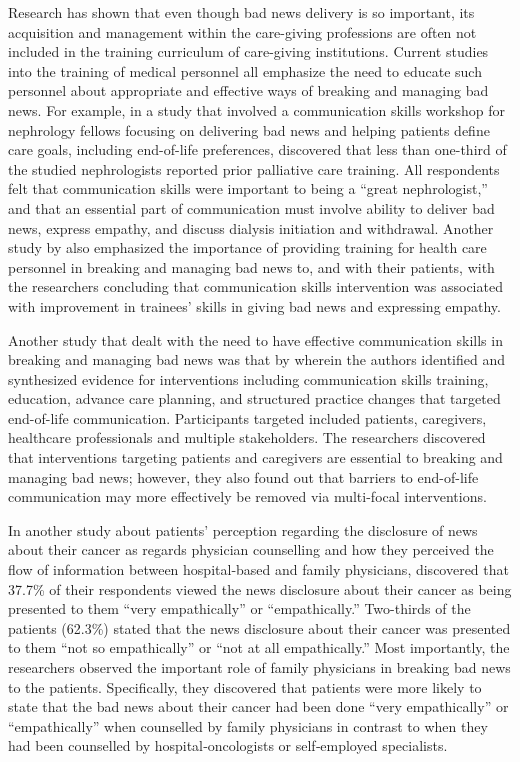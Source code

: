 \documentclass[output=paper,colorlinks,citecolor=brown]{langscibook}
\begin{document}
Research has shown that even though bad news delivery is so important, its acquisition and management within the care-giving professions are often not included in the training curriculum of care-giving institutions. Current studies into the training of medical personnel all emphasize the need to educate such personnel about appropriate and effective ways of breaking and managing bad news. For example, in a study that involved a communication skills workshop for nephrology fellows focusing on delivering bad news and helping patients define care goals, including end-of-life preferences, \citet{SchellEtAl2013} discovered that less than one-third of the studied nephrologists reported prior palliative care training. All respondents felt that communication skills were important to being a “great nephrologist,” and that an essential part of communication must involve ability to deliver bad news, express empathy, and discuss dialysis initiation and withdrawal. Another study by \citet{BaysEtAl2014} also emphasized the importance of providing training for health care personnel in breaking and managing bad news to, and with their patients, with the researchers concluding that communication skills intervention was associated with improvement in trainees' skills in giving bad news and expressing empathy. 

Another study that dealt with the need to have effective communication skills in breaking and managing bad news was that by \citet{WalczakEtAl2016} wherein the authors identified and synthesized evidence for interventions including communication skills training, education, advance care planning, and structured practice changes that targeted end-of-life communication. Participants targeted included patients, caregivers, healthcare professionals and multiple stakeholders. The researchers discovered that interventions targeting patients and caregivers are essential to breaking and managing bad news; however, they also found out that barriers to end-of-life communication may more effectively be removed via multi-focal interventions.

In another study about patients’ perception regarding the disclosure of news about their cancer as regards physician counselling and how they perceived the flow of information between hospital‐based and family physicians, \citet{SpiegelEtAl2009} discovered that 37.7\% of their respondents viewed the news disclosure about their cancer as being presented to them “very empathically” or “empathically.” Two-thirds of the patients (62.3\%) stated that the news disclosure about their cancer was presented to them “not so empathically” or “not at all empathically.” Most importantly, the researchers observed the important role of family physicians in breaking bad news to the patients. Specifically, they discovered that patients were more likely to state that the bad news about their cancer had been done “very empathically” or “empathically” when counselled by family physicians in contrast to when they had been counselled by hospital‐oncologists or self‐employed specialists. 
\end{document}
